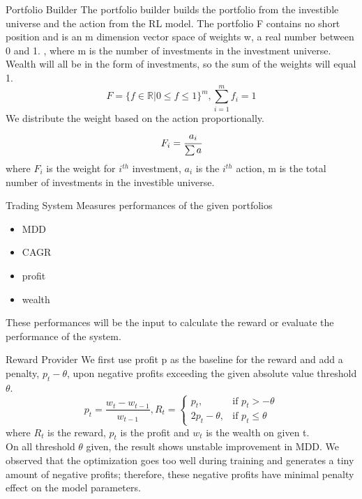 \begin{frame}{Portfolio Builder}
The portfolio builder builds the portfolio from the investible universe and the action from the RL model.
The portfolio F contains no short position and is an m dimension vector space of weights w, a real number between 0 and 1. , where m is the number of investments in the investment universe. Wealth will all be in the form of investments, so the sum of the weights will equal 1.
\[
    F = \{ {f \in \mathbb{R} | 0 \leq f \leq 1 } \} ^m,
    \sum_{i=1}^m {f_i} =1
\]
We distribute the weight based on the action proportionally.
\[
    F_i = \cfrac{a_i}{\sum a} 
\]
where \(F_i\) is the weight for \(i^{th}\) investment, \(a_i\) is the  \(i^{th}\) action, m is the total number of investments in the investible universe. 

\end{frame}


\begin{frame}{Trading System}
Measures performances of the given portfolios
\begin{itemize}
    \item MDD
    \item CAGR
    \item profit
    \item wealth
\end{itemize}
These performances will be the input to calculate the reward or evaluate the performance of the system. 
    
\end{frame}

\begin{frame}{Reward Provider}
We first use profit p as the baseline for the reward and add a penalty, \(p_t-\theta\), upon negative profits exceeding the given absolute value threshold \(\theta\). 
\[
p_t = \frac{w_t-w_{t-1}}{w_{t-1}}
, 
R_t = 
\begin{cases}
    p_t,&\text{if  }p_t > -\theta\\
    2p_t - \theta ,&\text{if  }p_t \leq  \theta
\end{cases}
\]
where \(R_t\) is the reward, \(p_t\) is the profit and \(w_t\) is the wealth on given t.
\\
On all threshold \(\theta\) given, the result shows unstable improvement in MDD. We observed that the optimization goes too well during training and generates a tiny amount of negative profits; therefore, these negative profits have minimal penalty effect on the model parameters.
\\

\end{frame}

